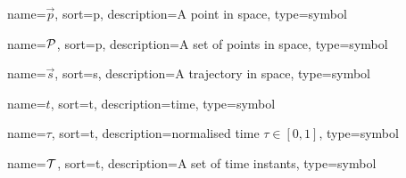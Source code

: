 	{%
		name={\ensuremath{\vec{p}}},
		sort=p,
		description=A point in space,
		type=symbol
	}
	\newcommand{\point}{\gls{sym:point}}

	{%
		name={\ensuremath{\set{P}}},
		sort=p,
		description=A set of points in space,
		type=symbol
	}
	\newcommand{\setofpoints}{\gls{sym:setofpoints}}

	{%
		name={\ensuremath{\vec{s}}},
		sort=s,
		description=A trajectory in space,
		type=symbol
	}
	\newcommand{\traj}{\gls{sym:traj}}

	\newcommand{\pathsym}{\traj}


	{%
		name={\ensuremath{t}},
		sort=t,
		description=time,
		type=symbol
	}
	\newcommand{\timesym}{\gls{sym:time}}

	{%
		name={\ensuremath{\tau}},
		sort=t,
		description=normalised time \ensuremath{\tau \in [0, 1]},
		type=symbol
	}
	\newcommand{\timenorm}{\gls{sym:timenorm}}

	{%
		name={\ensuremath{\set{T}}},
		sort=t,
		description=A set of time instants,
		type=symbol
	}
	\newcommand{\setoftimeinstants}{\gls{sym:setoftimeinstants}}

